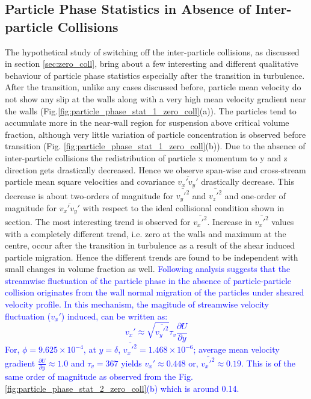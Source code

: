 \subsection{Particle Phase Statistics in Absence of Inter-particle Collisions}
\label{sec:Particle Phase Statistics zero_coll}
The hypothetical study of switching off the inter-particle collisions, as discussed in section \ref{sec:zero_coll}, bring about a few interesting and different qualitative behaviour of particle phase statistics especially after the transition in turbulence. After the transition, unlike any cases discussed before, particle mean velocity do not show any slip at the walls along with a very high mean velocity gradient near the walls (Fig.\ref{fig:particle_phase_stat_1_zero_coll}(a)). The particles tend to accumulate more in the near-wall region for suspension above critical volume fraction, although very little variation of particle concentration is observed before transition (Fig. \ref{fig:particle_phase_stat_1_zero_coll}(b)). Due to the absence of inter-particle collisions the redistribution of particle x momentum to y and z direction gets drastically decreased. Hence we observe span-wise and cross-stream particle mean square velocities and covariance $\overline{v_x'v_y'}$ drastically decrease.  This decrease is about two-orders of magnitude for $\bar{v_y'^2}$ and $\bar{v_z'^2}$ and one-order of magnitude for $\overline{v_x'v_y'}$ with respect to the ideal collisional condition shown in section\label{sec:Particle Phase Statistics}. 
The most interesting trend is observed for $\bar{v_x'^2}$. Increase in $\bar{v_x'^2}$ values with a completely different trend, i.e. zero at the walls and maximum at the centre, occur after the transition in turbulence as a result of the  shear induced particle migration. Hence the different trends are found to be independent with small changes in volume fraction as well. \textcolor{blue}{Following analysis suggests that the streamwise fluctuation of the particle phase in the absence of particle-particle collision originates from the wall normal migration of the particles under sheared velocity profile. In this mechanism, the magitude of streamwise velocity fluctuation ($v_x'$) induced, can be written as:
\begin{equation}
    v_x'\approx\sqrt{\overline{v_y'^2}}\tau_v \frac{\partial U}{\partial y}
\end{equation} 
For, $\phi=9.625\times10^{-4}$, at $y=\delta$, $\overline{v_x'^2}=1.468\times10^{-6}$; average mean velocity gradient $\frac{\partial U}{\partial y}\approx1.0$
and $\tau_v=367$ yields 
\begin{math}
v_x'\approx 0.448
\end{math}
or, 
\begin{math}
\overline{v_x'^2}\approx 0.19
\end{math}. 
This is of the same order of magnitude as observed from the Fig. \ref{fig:particle_phase_stat_2_zero_coll}(b) which is around 0.14.}

